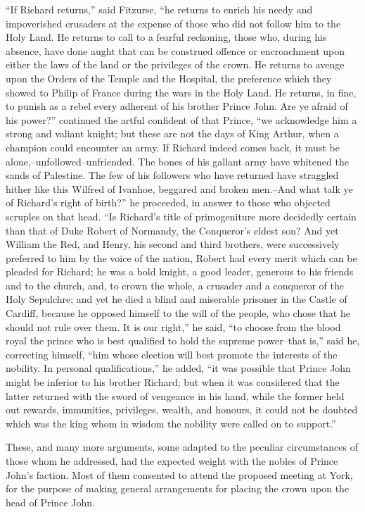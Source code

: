 ``If Richard returns,'' said Fitzurse, ``he returns to enrich his needy
and impoverished crusaders at the expense of those who did not follow
him to the Holy Land. He returns to call to a fearful reckoning, those
who, during his absence, have done aught that can be construed offence
or encroachment upon either the laws of the land or the privileges of
the crown. He returns to avenge upon the Orders of the Temple and the
Hospital, the preference which they showed to Philip of France during
the wars in the Holy Land. He returns, in fine, to punish as a rebel
every adherent of his brother Prince John. Are ye afraid of his power?''
continued the artful confident of that Prince, ``we acknowledge him a
strong and valiant knight; but these are not the days of King Arthur,
when a champion could encounter an army. If Richard indeed comes back,
it must be alone,--unfollowed--unfriended. The bones of his gallant army
have whitened the sands of Palestine. The few of his followers who have
returned have straggled hither like this Wilfred of Ivanhoe, beggared
and broken men.--And what talk ye of Richard's right of birth?'' he
proceeded, in answer to those who objected scruples on that head. ``Is
Richard's title of primogeniture more decidedly certain than that of
Duke Robert of Normandy, the Conqueror's eldest son? And yet William the
Red, and Henry, his second and third brothers, were successively
preferred to him by the voice of the nation, Robert had every merit
which can be pleaded for Richard; he was a bold knight, a good leader,
generous to his friends and to the church, and, to crown the whole, a
crusader and a conqueror of the Holy Sepulchre; and yet he died a blind
and miserable prisoner in the Castle of Cardiff, because he opposed
himself to the will of the people, who chose that he should not rule
over them. It is our right,'' he said, ``to choose from the blood royal
the prince who is best qualified to hold the supreme power--that is,''
said he, correcting himself, ``him whose election will best promote the
interests of the nobility. In personal qualifications,'' he added, ``it
was possible that Prince John might be inferior to his brother Richard;
but when it was considered that the latter returned with the sword of
vengeance in his hand, while the former held out rewards, immunities,
privileges, wealth, and honours, it could not be doubted which was the
king whom in wisdom the nobility were called on to support.''

These, and many more arguments, some adapted to the peculiar
circumstances of those whom he addressed, had the expected weight with
the nobles of Prince John's faction. Most of them consented to attend
the proposed meeting at York, for the purpose of making general
arrangements for placing the crown upon the head of Prince John.

